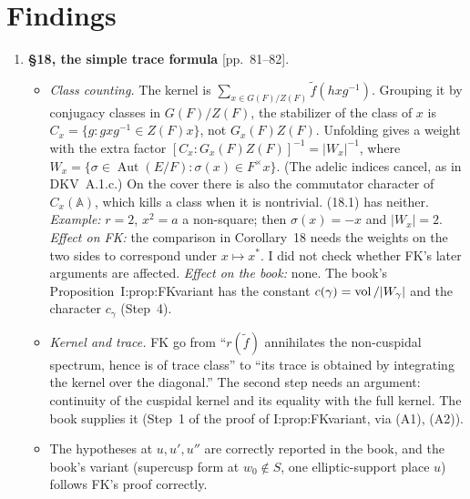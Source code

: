 \documentclass[12pt,letterpaper]{article}
\newcommand{\A}{\mathbb A}
\newcommand{\loc}[1]{{\small\textsf{[#1]}}}
\begin{document}
\section{Findings}

\begin{enumerate}[label=\textbf{F\arabic*.},leftmargin=2.4em]
\item \textbf{\S18, the simple trace formula} \loc{pp.~81--82}.
 \begin{itemize}
 \item[(a)] \emph{Class counting.} The kernel is $\sum_{x\in G(F)/Z(F)}\tilde f(hxg^{-1})$. Grouping it by conjugacy classes in $G(F)/Z(F)$, the stabilizer of the class of $x$ is $C_x=\{g:gxg^{-1}\in Z(F)x\}$, not $G_x(F)Z(F)$. Unfolding gives a weight with the extra factor $[C_x:G_x(F)Z(F)]^{-1}=|W_x|^{-1}$, where $W_x=\{\sigma\in\operatorname{Aut}(E/F):\sigma(x)\in F^\times x\}$. (The adelic indices cancel, as in DKV~A.1.c.) On the cover there is also the commutator character of $C_x(\A)$, which kills a class when it is nontrivial. (18.1) has neither. \emph{Example:} $r=2$, $x^2=a$ a non-square; then $\sigma(x)=-x$ and $|W_x|=2$.
 \emph{Effect on FK:} the comparison in Corollary~18 needs the weights on the two sides to correspond under $x\mapsto x^*$. I did not check whether FK's later arguments are affected.
 \emph{Effect on the book:} none. The book's Proposition~I:prop:FKvariant has the constant $c(\gamma)=\operatorname{vol}/|W_\gamma|$ and the character $c_\gamma$ (Step~4).
 \item[(b)] \emph{Kernel and trace.} FK go from ``$r(\tilde f)$ annihilates the non-cuspidal spectrum, hence is of trace class'' to ``its trace is obtained by integrating the kernel over the diagonal.'' The second step needs an argument: continuity of the cuspidal kernel and its equality with the full kernel. The book supplies it (Step~1 of the proof of I:prop:FKvariant, via (A1), (A2)).
 \item[(c)] The hypotheses at $u,u',u''$ are correctly reported in the book, and the book's variant (supercusp form at $w_0\notin S$, one elliptic-support place $u$) follows FK's proof correctly.
 \end{itemize}


\end{enumerate}
\end{document}
